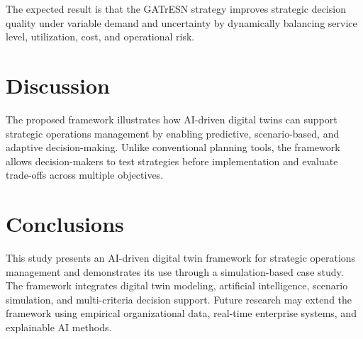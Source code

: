 \documentclass[11pt,a4paper]{article}
\begin{document}
%
%
%

The expected result is that the GATrESN strategy improves strategic decision quality under variable demand and uncertainty by dynamically balancing service level, utilization, cost, and operational risk.

\section{Discussion}
The proposed framework illustrates how AI-driven digital twins can support strategic operations management by enabling predictive, scenario-based, and adaptive decision-making. Unlike conventional planning tools, the framework allows decision-makers to test strategies before implementation and evaluate trade-offs across multiple objectives.

\section{Conclusions}
This study presents an AI-driven digital twin framework for strategic operations management and demonstrates its use through a simulation-based case study. The framework integrates digital twin modeling, artificial intelligence, scenario simulation, and multi-criteria decision support. Future research may extend the framework using empirical organizational data, real-time enterprise systems, and explainable AI methods.
\end{document}
